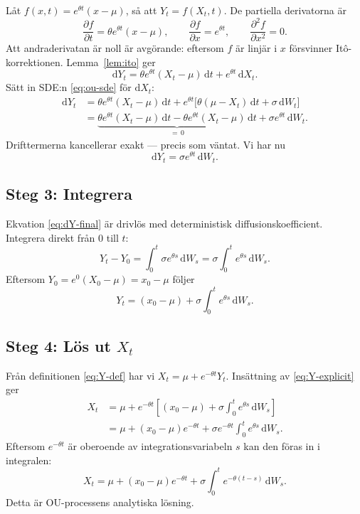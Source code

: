 \documentclass[11pt,a4paper]{article}
\newcommand{\dd}{\mathrm{d}}
\theoremstyle{plain}
\theoremstyle{definition}
\theoremstyle{remark}
\begin{document}
Låt $f(x,t) = e^{\theta t}(x - \mu)$, så att $Y_t = f(X_t, t)$. De partiella derivatorna är
\[
    \frac{\partial f}{\partial t} = \theta e^{\theta t}(x - \mu), \qquad
    \frac{\partial f}{\partial x} = e^{\theta t}, \qquad
    \frac{\partial^2 f}{\partial x^2} = 0.
\]
Att andraderivatan är noll är avgörande: eftersom $f$ är linjär i $x$ försvinner Itô-korrektionen. Lemma~\ref{lem:ito} ger
\begin{equation}
    \dd Y_t = \theta e^{\theta t}(X_t - \mu)\,\dd t + e^{\theta t}\,\dd X_t.
    \label{eq:dY-step1}
\end{equation}
Sätt in SDE:n \eqref{eq:ou-sde} för $\dd X_t$:
\begin{align}
    \dd Y_t &= \theta e^{\theta t}(X_t - \mu)\,\dd t + e^{\theta t}\bigl[\theta(\mu - X_t)\,\dd t + \sigma\,\dd W_t\bigr] \nonumber \\
    &= \underbrace{\theta e^{\theta t}(X_t - \mu)\,\dd t - \theta e^{\theta t}(X_t - \mu)\,\dd t}_{= \,0} + \sigma e^{\theta t}\,\dd W_t.
    \label{eq:dY-cancel}
\end{align}
Drifttermerna kancellerar exakt --- precis som väntat. Vi har nu
\begin{equation}
    \boxed{\dd Y_t = \sigma e^{\theta t}\,\dd W_t.}
    \label{eq:dY-final}
\end{equation}

\subsection*{Steg 3: Integrera}

Ekvation \eqref{eq:dY-final} är drivlös med deterministisk diffusionskoefficient. Integrera direkt från $0$ till $t$:
\begin{equation}
    Y_t - Y_0 = \int_0^t \sigma e^{\theta s}\,\dd W_s = \sigma \int_0^t e^{\theta s}\,\dd W_s.
    \label{eq:Y-integral}
\end{equation}
Eftersom $Y_0 = e^{0}(X_0 - \mu) = x_0 - \mu$ följer
\begin{equation}
    Y_t = (x_0 - \mu) + \sigma \int_0^t e^{\theta s}\,\dd W_s.
    \label{eq:Y-explicit}
\end{equation}

\subsection*{Steg 4: Lös ut $X_t$}

Från definitionen \eqref{eq:Y-def} har vi $X_t = \mu + e^{-\theta t} Y_t$. Insättning av \eqref{eq:Y-explicit} ger
\begin{align}
    X_t &= \mu + e^{-\theta t}\!\left[(x_0 - \mu) + \sigma \int_0^t e^{\theta s}\,\dd W_s\right] \nonumber \\
    &= \mu + (x_0 - \mu)e^{-\theta t} + \sigma e^{-\theta t}\int_0^t e^{\theta s}\,\dd W_s.
\end{align}
Eftersom $e^{-\theta t}$ är oberoende av integrationsvariabeln $s$ kan den föras in i integralen:
\begin{equation}
    \boxed{X_t = \mu + (x_0 - \mu)e^{-\theta t} + \sigma \int_0^t e^{-\theta(t-s)}\,\dd W_s.}
    \label{eq:ou-solution}
\end{equation}
Detta är OU-processens analytiska lösning.
\end{document}
